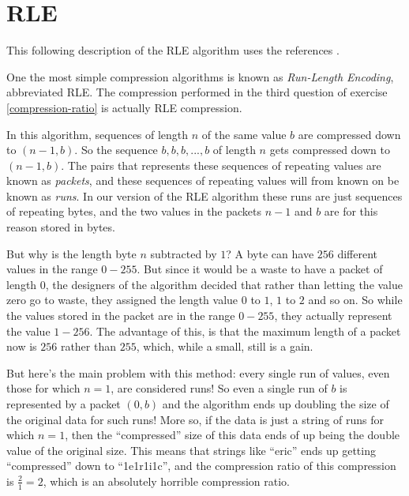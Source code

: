 \section{RLE}
\label{sec:rle}

This following description of the RLE algorithm uses the references
\cite{nagarajan11:_enhan_approac_run_lengt_encod_schem,murray1996encyclopedia,mark1996data_compression_book}.

One the most simple compression algorithms is known as
\textit{Run-Length Encoding}, abbreviated
RLE. The compression performed in the third question of
exercise \ref{compression-ratio} is actually RLE compression.

In this algorithm, sequences of length $n$ of the same value $b$ are
compressed down to $(n-1,b)$. So the sequence $b,b,b,...,b$ of length
$n$ gets compressed down to $(n-1,b)$. The pairs that represents these
sequences of repeating values are known as \textit{packets}, and these
sequences of repeating values will from known on be known as
\textit{runs}. In our version of the RLE algorithm these runs are just
sequences of repeating bytes, and the two values in the packets $n-1$
and $b$ are for this reason stored in bytes.

But why is the length byte $n$ subtracted by $1$?  A
byte can have $256$ different values in the range $0-255$. But since
it would be a waste to have a packet of length $0$, the designers of
the algorithm decided that rather than letting the value zero go to
waste, they assigned the length value $0$ to $1$, $1$ to $2$  and so
on. So while the values stored in the packet are in the range $0-255$,
they actually represent the value $1-256$. The advantage of this, is
that the maximum length of a packet now is $256$ rather than $255$,
which, while a small, still is a gain.

But here's the main problem with this method: every single run of
values, even those for which $n=1$, are considered runs! So even a
single run of $b$ is represented by a packet $(0,b)$ and the algorithm
ends up doubling the size of the original data for such runs! More so,
if the data is just a string of runs for which $n=1$, then the
``compressed'' size of this data ends of up being the double value of
the original size. This means that strings like ``eric'' ends up
getting ``compressed'' down to ``1e1r1i1c'', and the compression ratio
of this compression is $\frac{2}{1} = 2$, which is an absolutely
horrible compression ratio.


